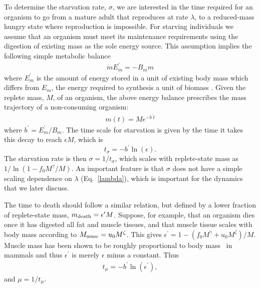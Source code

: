 \documentclass{pnastwo}
\begin{document}
\begin{article}
To determine the starvation rate, $\sigma$, we are interested in the time
required for an organism to go from a mature adult that reproduces at rate
$\lambda$, to a
reduced-mass hungry state where reproduction is impossible.  For starving individuals we assume that an organism must meet its maintenance requirements using the digestion of existing mass as the sole energy source.
This assumption implies the following simple metabolic balance 
\begin{eqnarray}
\dot{m}E_{m}^{\prime}=-B_{m}m
\end{eqnarray}
where $E_{m}^{\prime}$ is the amount of energy stored in a unit of existing
body mass which differs from $E_{m}$, the energy required to
synthesis a unit of biomass \cite{hou}. Given the replete mass, $M$, of an organism, the
above energy balance prescribes the mass trajectory of a non-consuming
organism:
\begin{eqnarray}
\label{mt}
m\left(t\right)=Me^{-b^{\prime}t}
\end{eqnarray}
where $b^{\prime}=E_{m}^{\prime}/B_{m}$. The time scale for starvation is given by the time it takes this decay to reach $\epsilon M$, which is
\begin{equation}
\label{eq:sigma}
t_{\sigma}=-b^{\prime}\ln\left(\epsilon\right).
\end{equation}
The starvation rate is then $\sigma=1/t_{\sigma}$, which scales with
replete-state mass as $1/\ln\left(1-f_{0}M^{\gamma}/M\right)$.  An important
feature is that $\sigma$ does not have a simple scaling dependence on
$\lambda$ (Eq.~\ref{lambda}), which is important for the dynamics that we
later discuss.

The time to death should follow a similar relation, but defined by a lower
fraction of replete-state mass, $m_{\rm death}=\epsilon^{\prime} M$.
Suppose, for example, that an organism dies once it has digested all fat and
muscle tissues, and that muscle tissue scales with body mass according to
$M_{\rm musc}=u_{0}M^{\zeta}$.  This gives
$\epsilon^{\prime}=1-\left(f_{0}M^{\gamma}+u_{0}M^{\zeta}\right)/M$. Muscle
mass has been shown to be roughly proportional to body mass~\cite{Folland:2008ij} in
mammals and thus $\epsilon^{\prime}$ is merely $\epsilon$ minus a constant.
Thus
\begin{eqnarray}
t_{\mu}=-b^{\prime}\ln\left(\epsilon^{\prime}\right),
\end{eqnarray}
and $\mu=1/t_{\mu}$. 



\end{article}
\end{document}
